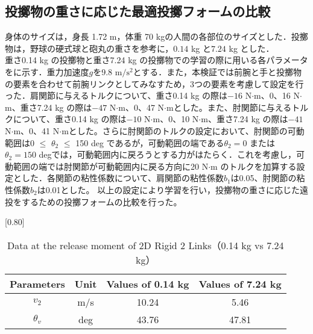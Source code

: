 \begin{small}
\subsection{投擲物の重さに応じた最適投擲フォームの比較}
身体のサイズは，身長 1.72 m，体重 70 kgの人間の各部位のサイズとした．投擲物は，野球の硬式球と砲丸の重さを参考に，$0.14$ kg\cite{horiuchi} と$7.24$ kg\cite{haq} とした．\\
重さ0.14 kg の投擲物と重さ7.24 kg の投擲物での学習の際に用いる各パラメータをに示す\cite{irving}．重力加速度$g$を9.8 $\mathrm{m/s^{2}}$とする．また，本検証では前腕と手と投擲物の要素を合わせて前腕リンクとしてみなすため，3つの要素を考慮して設定を行った．肩関節に与えるトルクについて、重さ0.14 kg の際は$-16$ N$\cdot$m、0、16 N$\cdot$m、重さ7.24 kg の際は$-47$ N$\cdot$m、0、47 N$\cdot$mとした。また、肘関節に与えるトルクについて、重さ0.14 kg の際は$-10$ N$\cdot$m、0、10 N$\cdot$m、重さ7.24 kg の際は$-41$ N$\cdot$m、0、41 N$\cdot$mとした。さらに肘関節のトルクの設定において、肘関節の可動範囲は0 $\le$ $\theta_{2}$ $\le$ 150 deg であるが，可動範囲の端である$\theta_{2} = 0$ または $\theta_{2} = 150$ degでは，可動範囲内に戻ろうとする力がはたらく．これを考慮し，可動範囲の端では肘関節が可動範囲内に戻る方向に20 N$\cdot$m のトルクを加算する設定とした．各関節の粘性係数について、肩関節の粘性係数$b_{1}$は0.05、肘関節の粘性係数$b_{2}$は0.01とした。
以上の設定により学習を行い，投擲物の重さに応じた遠投をするための投擲フォームの比較を行った。
\begin{table}[t]
  \begin{center}
    \caption{Data at the release moment of 2D Rigid 2 Links（0.14 kg vs 7.24 kg）}
    \scalebox{0.80}[0.80]{
    \begin{tabular}{c|c|c|c}
      \hline
      Parameters & Unit & Values of 0.14 kg & Values of 7.24 kg \\
      \hline
      $v_{2}$ & m/s & 10.24 & 5.46 \\
      $\theta_{v}$ & deg & 43.76 & 47.81 \\
      \hline
    \end{tabular}
    }
  \end{center}
\end{table}

\end{small}
